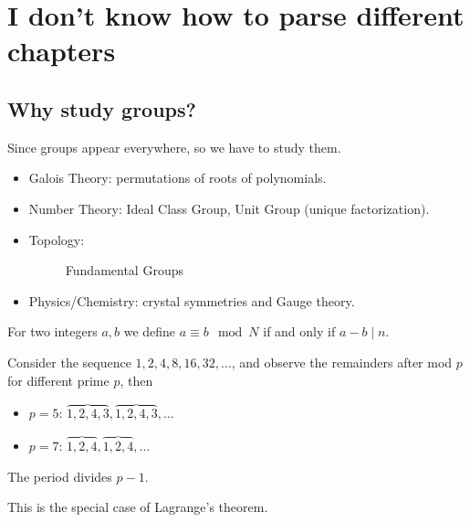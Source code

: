 \chapter{I don't know how to parse different chapters}
\section{Why study groups?}
Since groups appear everywhere, so we have to study them.
\begin{itemize}
    \item Galois Theory: permutations of roots of polynomials. 
    \item Number Theory: Ideal Class Group, Unit Group (unique factorization). 
    \item Topology: 
    \begin{figure}[H]
        \centering
        \caption{Fundamental Groups}
        \label{fig:DonutCup}
    \end{figure}
    \item Physics/Chemistry: crystal symmetries and Gauge theory.
\end{itemize}

\begin{definition}[mod] \label{def: mod}
    For two integers \(a,b\) we define \(a \equiv b \mod{N}\) if and only if \(a - b \mid n\).  
\end{definition}

Consider the sequence \(1,2,4,8,16,32, \dots \), and observe the remainders after mod \(p\) for different prime \(p\), then 
\begin{itemize}
    \item \(p=5\): \(\overbrace{1,2,4,3}, \overbrace{1,2,4,3}, \dots \)
    \item \(p=7\): \(\overbrace{1,2,4}, \overbrace{1,2,4}, \dots \) 
\end{itemize}   

\begin{theorem} \label{thm: Fermat's little theorem}
    The period divides \(p-1\). 
\end{theorem}
\begin{note}
    This is the special case of Lagrange's theorem.
\end{note}

